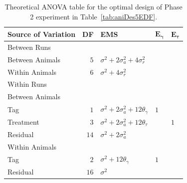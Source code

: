 \begin{table}[!ht]
\centering
 \caption{Theoretical ANOVA table for the optimal design of Phase 2 experiment in Table~\ref{tab:aniDes5EDF}.}
 \begin{tabular}[t]{lrlll} 
 \toprule 
 \multicolumn{1}{l}{\textbf{Source of Variation}} & \multicolumn{1}{l}{\textbf{DF}} & \multicolumn{1}{l}{\textbf{EMS}}& \multicolumn{1}{l}{$\bm{E_{\gamma}}$}&\multicolumn{1}{l}{$\bm{E_{\tau}}$}\\ 
 \midrule 
 Between Runs &  &  & & \\ 
 \quad Between Animals & $5$ & $\sigma^2+2\sigma_{a}^2+4\sigma_{r}^2$ & & \\  \quad Within Animals & $6$ & $\sigma^2+4\sigma_{r}^2$ & & \\ \hline 
 Within Runs &  &  & & \\ 
 \quad Between Animals &  &  & & \\ 
 \quad \quad Tag & $1$ & $\sigma^2+2\sigma_{a}^2+12\theta_{\gamma}$ &$1$ & \\ 
 \quad \quad Treatment & $3$ & $\sigma^2+2\sigma_{a}^2+12\theta_{\tau}$ & & $1$\\ 
 \quad \quad Residual & $14$ & $\sigma^2+2\sigma_{a}^2$ & & \\ \hline 
 \quad Within Animals &  &  & & \\ 
 \quad \quad Tag & $2$ & $\sigma^2+12\theta_{\gamma}$ &$1$ & \\ 
 \quad \quad Residual & $16$ & $\sigma^2$ & & \\ 
 \bottomrule 
 \end{tabular} 
 \label{tab:ANOVAPhase1CRD21} 


\end{table}
